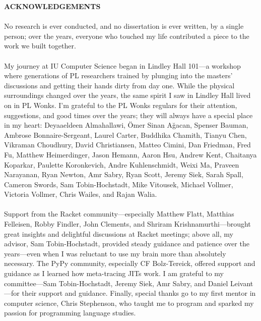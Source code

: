 \begin{centering}
\textbf{ACKNOWLEDGEMENTS}\\
\vspace{\baselineskip}
\end{centering}

\paragraph{}%
  No research is ever conducted, and no dissertation is ever written, by a single person; over the years, everyone who touched my life contributed a piece to the work we built together.

\paragraph{}%
  My journey at IU Computer Science began in Lindley Hall 101—a workshop where generations of PL researchers trained by plunging into the masters' discussions and getting their hands dirty from day one. While the physical surroundings changed over the years, the same spirit I saw in Lindley Hall lived on in PL Wonks. I'm grateful to the PL Wonks regulars for their attention, suggestions, and good times over the years; they will always have a special place in my heart: Deyaaeldeen Almahallawi, Ömer Sinan Ağacan, Spenser Bauman, Ambrose Bonnaire-Sergeant, Laurel Carter, Buddhika Chamith, Tianyu Chen, Vikraman Choudhury, David Christiansen, Matteo Cimini, Dan Friedman, Fred Fu, Matthew Heimerdinger, Jason Hemann, Aaron Hsu, Andrew Kent, Chaitanya Koparkar, Paulette Koronkevich, Andre Kuhlenschmidt, Weixi Ma, Praveen Narayanan, Ryan Newton, Amr Sabry, Ryan Scott, Jeremy Siek, Sarah Spall, Cameron Swords, Sam Tobin-Hochstadt, Mike Vitousek, Michael Vollmer, Victoria Vollmer, Chris Wailes, and Rajan Walia.

\paragraph{}%
  Support from the Racket community—especially Matthew Flatt, Matthias Felleisen, Robby Findler, John Clements, and Shriram Krishnamurthi—brought great insights and delightful discussions at Racket meetings; above all, my advisor, Sam Tobin-Hochstadt, provided steady guidance and patience over the years—even when I was reluctant to use my brain more than absolutely necessary. The PyPy community, especially CF Bolz-Tereick, offered support and guidance as I learned how meta-tracing JITs work. I am grateful to my committee—Sam Tobin-Hochstadt, Jeremy Siek, Amr Sabry, and Daniel Leivant—for their support and guidance. Finally, special thanks go to my first mentor in computer science, Chris Stephenson, who taught me to program and sparked my passion for programming language studies.


